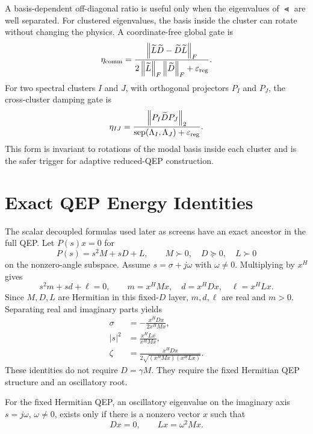 A basis-dependent off-diagonal ratio is useful only when the eigenvalues of
\(\Lt\) are well separated. For clustered eigenvalues, the basis inside the
cluster can rotate without changing the physics. A coordinate-free global gate is
\begin{equation}
  \eta_{\rm comm}
  =
  \frac{\left\lVert \widetilde L\widetilde D-\widetilde D\widetilde L \right\rVert_F}
  {2\left\lVert \widetilde L \right\rVert_F\left\lVert \widetilde D \right\rVert_F+\varepsilon_{\rm reg}}.
  \label{eq:commutator_nonprop_index}
\end{equation}
For two spectral clusters \(I\) and \(J\), with orthogonal projectors
\(P_I\) and \(P_J\), the cross-cluster damping gate is
\begin{equation}
  \eta_{IJ}
  =
  \frac{\left\lVert P_I\widetilde D P_J \right\rVert_2}
  {\operatorname{sep}(\Lambda_I,\Lambda_J)+\varepsilon_{\rm reg}}.
  \label{eq:projector_cluster_nonprop}
\end{equation}
This form is invariant to rotations of the modal basis inside each cluster and
is the safer trigger for adaptive reduced-QEP construction.

\section{Exact QEP Energy Identities}

The scalar decoupled formulas used later as screens have an exact ancestor in
the full QEP. Let \(P(s)x=0\) for
\[
  P(s)=s^2M+sD+L,
  \qquad
  M\succ0,\quad D\succeq0,\quad L\succ0
\]
on the nonzero-angle subspace. Assume \(s=\sigma+j\omega\) with
\(\omega\ne0\). Multiplying by \(x^H\) gives
\begin{equation}
  s^2 m+s d+\ell=0,
  \qquad
  m=x^HMx,\quad d=x^HDx,\quad \ell=x^HLx.
  \label{eq:qep_scalar_energy_identity}
\end{equation}
Since \(M,D,L\) are Hermitian in this fixed-\(D\) layer, \(m,d,\ell\) are real
and \(m>0\). Separating real and imaginary parts yields
\begin{align}
  \sigma
  &=
  -\frac{x^HDx}{2x^HMx}, \label{eq:qep_exact_sigma}\\
  |s|^2
  &=
  \frac{x^HLx}{x^HMx}, \label{eq:qep_exact_modulus}\\
  \zeta
  &=
  \frac{x^HDx}
  {2\sqrt{(x^HMx)(x^HLx)}}. \label{eq:qep_exact_zeta}
\end{align}
These identities do not require \(D=\gamma M\). They require the fixed
Hermitian QEP structure and an oscillatory root.

\begin{proposition}
For the fixed Hermitian QEP, an oscillatory eigenvalue on the imaginary axis
\(s=j\omega\), \(\omega\ne0\), exists only if there is a nonzero vector \(x\)
such that
\begin{equation}
  Dx=0,\qquad Lx=\omega^2Mx.
  \label{eq:undamped_mode_condition}
\end{equation}
\end{proposition}

